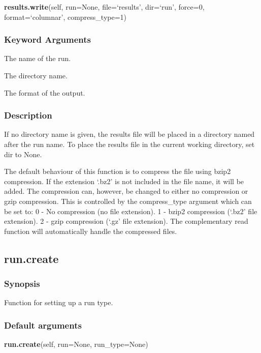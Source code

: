 \textsf{\textbf{results.write}(self, run=None, file=`results', dir=`run', force=0, format=`columnar', compress\_type=1)}


\subsubsection{Keyword Arguments}

  The name of the run.

  The directory name.

  The format of the output.


\subsubsection{Description}

If no directory name is given, the results file will be placed in a directory named after
the run name.  To place the results file in the current working directory, set dir to None.

The default behaviour of this function is to compress the file using bzip2 compression.  If
the extension `.bz2' is not included in the file name, it will be added.  The compression
can, however, be changed to either no compression or gzip compression.  This is controlled
by the compress\_type argument which can be set to:
    0 - No compression (no file extension).
    1 - bzip2 compression (`.bz2' file extension).
    2 - gzip compression (`.gz' file extension).
The complementary read function will automatically handle the compressed files.


\newpage

\subsection{run.create}


\subsubsection{Synopsis}

Function for setting up a run type.

\subsubsection{Default arguments}

\textsf{\textbf{run.create}(self, run=None, run\_type=None)}


